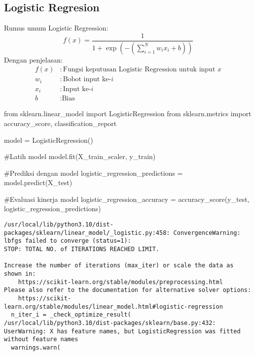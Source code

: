 \documentclass[
  letterpaper,
]{krantz}
\makeatletter
\newenvironment{Shaded}{\begin{snugshade}}{\end{snugshade}}
\newcommand{\CommentTok}[1]{\textcolor[rgb]{0.37,0.37,0.37}{#1}}
\newcommand{\ImportTok}[1]{\textcolor[rgb]{0.00,0.46,0.62}{#1}}
\newcommand{\NormalTok}[1]{\textcolor[rgb]{0.00,0.23,0.31}{#1}}
\newcommand{\OperatorTok}[1]{\textcolor[rgb]{0.37,0.37,0.37}{#1}}
\newenvironment{kframe}{%
\medskip{}
\setlength{\fboxsep}{.8em}
 \def\at@end@of@kframe{}%
 \ifinner\ifhmode%
  \def\at@end@of@kframe{\end{minipage}}%
  \begin{minipage}{\columnwidth}%
 \fi\fi%
 \def\FrameCommand##1{\hskip\@totalleftmargin \hskip-\fboxsep
 \colorbox{shadecolor}{##1}\hskip-\fboxsep
     \hskip-\linewidth \hskip-\@totalleftmargin \hskip\columnwidth}%
 \MakeFramed {\advance\hsize-\width
   \@totalleftmargin\z@ \linewidth\hsize
   \@setminipage}}%
 {\par\unskip\endMakeFramed%
 \at@end@of@kframe}
\renewenvironment{Shaded}{\begin{kframe}}{\end{kframe}}
\makeatother
\begin{document}
\hypertarget{logistic-regresion}{%
\subsection{Logistic Regresion}\label{logistic-regresion}}

Rumus umum Logistic Regression: \[
f(x) = \frac{1}{1 + \exp(-\left(\sum_{i=1}^{N} w_i x_i + b\right))}
\] Dengan penjelasan: \[
\begin{align*}
f(x) & : \text{Fungsi keputusan Logistic Regression untuk input } x \\
w_i & : \text{Bobot input ke-} i \\
x_i & : \text{Input ke-} i \\
b & : \text{Bias}
\end{align*}
\]

\begin{Shaded}
\begin{Highlighting}[]
\ImportTok{from}\NormalTok{ sklearn.linear\_model }\ImportTok{import}\NormalTok{ LogisticRegression}
\ImportTok{from}\NormalTok{ sklearn.metrics }\ImportTok{import}\NormalTok{ accuracy\_score, classification\_report}

\NormalTok{model }\OperatorTok{=}\NormalTok{ LogisticRegression()}

\CommentTok{\#Latih model}
\NormalTok{model.fit(X\_train\_scaler, y\_train)}

\CommentTok{\#Prediksi dengan model}
\NormalTok{logistic\_regression\_predictions }\OperatorTok{=}\NormalTok{ model.predict(X\_test)}

\CommentTok{\#Evaluasi kinerja model}
\NormalTok{logistic\_regression\_accuracy }\OperatorTok{=}\NormalTok{ accuracy\_score(y\_test, logistic\_regression\_predictions)}
\end{Highlighting}
\end{Shaded}

\begin{verbatim}
/usr/local/lib/python3.10/dist-packages/sklearn/linear_model/_logistic.py:458: ConvergenceWarning: lbfgs failed to converge (status=1):
STOP: TOTAL NO. of ITERATIONS REACHED LIMIT.

Increase the number of iterations (max_iter) or scale the data as shown in:
    https://scikit-learn.org/stable/modules/preprocessing.html
Please also refer to the documentation for alternative solver options:
    https://scikit-learn.org/stable/modules/linear_model.html#logistic-regression
  n_iter_i = _check_optimize_result(
/usr/local/lib/python3.10/dist-packages/sklearn/base.py:432: UserWarning: X has feature names, but LogisticRegression was fitted without feature names
  warnings.warn(
\end{verbatim}
\end{document}
